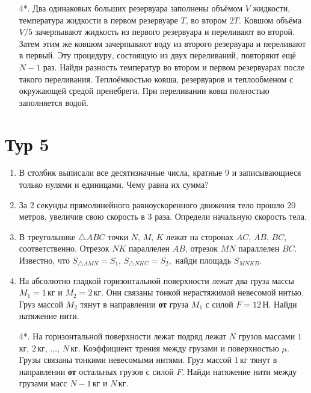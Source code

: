 \documentclass[12pt]{article} %
\begin{document}
\begin{enumerate}
\item[4*.]
Два одинаковых больших резервуара заполнены объёмом $V$ жидкости, температура жидкости в первом резервуаре $T$, 
во втором $2 T$. Ковшом объёма $V / 5$ зачерпывают жидкость из первого резервуара и переливают во второй. 
Затем этим же ковшом зачерпывают воду из второго резервуара и переливают в первый. Эту процедуру, 
состоящую из двух переливаний, повторяют ещё $N - 1$ раз. Найди разность температур во втором и первом резервуарах после такого переливания. 
Теплоёмкостью ковша, резервуаров и теплообменом с окружающей средой пренебреги. При переливании ковш полностью заполняется водой.



\end{enumerate}
    


\section*{Тур 5}

\begin{enumerate}
\item В столбик выписали все десятизначные числа, кратные 9 и записывающиеся только нулями и единицами. 
Чему равна их сумма? 

\item За 2 секунды прямолинейного равноускоренного движения тело прошло 20 метров, увеличив свою скорость в 3 раза. 
Определи начальную скорость тела.

\item В треугольнике $\bigtriangleup ABC$ точки $N,\,M,\,K$ лежат на сторонах $AC,\,AB,\,BC$, соответственно. 
Отрезок $NK$ параллелен $AB$, отрезок $MN$ параллелен $BC$. Известно, что $S_{\bigtriangleup AMN} = S_1$, 
$S_{\bigtriangleup NKC} = S_2,$ найди площадь $S_{MNKB}$.

\item На абсолютно гладкой горизонтальной поверхности лежат два груза массы $M_1 = 1$\,кг и $M_2 = 2$\,кг. 
Они связаны тонкой нерастяжимой невесомой нитью. Груз массой $M_2$ тянут в направлении {\bf от} груза $M_1$ с силой $F = 12$\,Н. 
Найди натяжение нити.

\item[4*.] На горизонтальной поверхности лежат подряд лежат $N$ грузов массами $1$\,кг, $2$\,кг, $\ldots$, $N$\,кг. 
Коэффициент трения между грузами и поверхностью $\mu$. Грузы связаны тонкими невесомыми нитями. 
Груз массой $1$\,кг тянут в направлении {\bf от} остальных грузов с силой $F$. 
Найди натяжение нити между грузами масс $N - 1$\,кг и $N$\,кг.


\end{enumerate}
    
\end{document}
